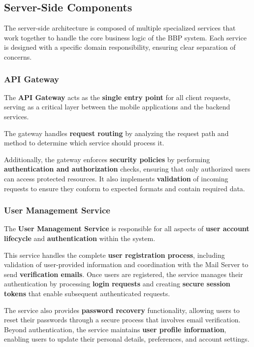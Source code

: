 \subsection{Server-Side Components}

The server-side architecture is composed of multiple specialized services that work together to handle the core business logic of the BBP system. Each service is designed with a specific domain responsibility, ensuring clear separation of concerns.

\subsubsection{API Gateway}
The \textbf{API Gateway} acts as the \textbf{single entry point} for all client requests, serving as a critical layer between the mobile applications and the backend services. 

The gateway handles \textbf{request routing} by analyzing the request path and method to determine which service should process it. 

Additionally, the gateway enforces \textbf{security policies} by performing \textbf{authentication and authorization} checks, ensuring that only authorized users can access protected resources. It also implements \textbf{validation} of incoming requests to ensure they conform to expected formats and contain required data.

\subsubsection{User Management Service}
The \textbf{User Management Service} is responsible for all aspects of \textbf{user account lifecycle} and \textbf{authentication} within the system. 

This service handles the complete \textbf{user registration process}, including validation of user-provided information and coordination with the Mail Server to send \textbf{verification emails}. Once users are registered, the service manages their authentication by processing \textbf{login requests} and creating \textbf{secure session tokens} that enable subsequent authenticated requests. 

The service also provides \textbf{password recovery} functionality, allowing users to reset their passwords through a secure process that involves email verification. Beyond authentication, the service maintains \textbf{user profile information}, enabling users to update their personal details, preferences, and account settings. 

